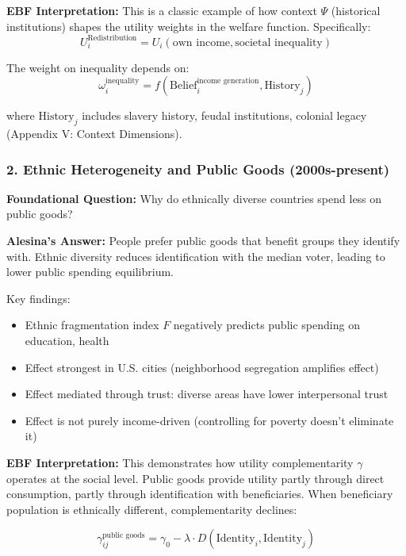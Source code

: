 \textbf{EBF Interpretation:} This is a classic example of how context $\Psi$ (historical institutions) shapes the utility weights in the welfare function. Specifically:
\begin{equation}
U^{\text{Redistribution}}_i = U_i(\text{own income}, \text{societal inequality})
\end{equation}

The weight on inequality depends on:
\begin{equation}
\omega_i^{\text{inequality}} = f(\text{Belief}_i^{\text{income generation}}, \text{History}_j)
\end{equation}

where $\text{History}_j$ includes slavery history, feudal institutions, colonial legacy (Appendix V: Context Dimensions).

\subsubsection{2. Ethnic Heterogeneity and Public Goods (2000s-present)}

\textbf{Foundational Question:} Why do ethnically diverse countries spend less on public goods?

\textbf{Alesina's Answer:} People prefer public goods that benefit groups they identify with. Ethnic diversity reduces identification with the median voter, leading to lower public spending equilibrium.

Key findings:
\begin{itemize}
\item Ethnic fragmentation index $F$ negatively predicts public spending on education, health
\item Effect strongest in U.S. cities (neighborhood segregation amplifies effect)
\item Effect mediated through trust: diverse areas have lower interpersonal trust
\item Effect is not purely income-driven (controlling for poverty doesn't eliminate it)
\end{itemize}

\textbf{EBF Interpretation:} This demonstrates how utility complementarity $\gamma$ operates at the social level. Public goods provide utility partly through direct consumption, partly through identification with beneficiaries. When beneficiary population is ethnically different, complementarity declines:

\begin{equation}
\gamma^{\text{public goods}}_{ij} = \gamma_0 - \lambda \cdot D(\text{Identity}_i, \text{Identity}_j)
\end{equation}

